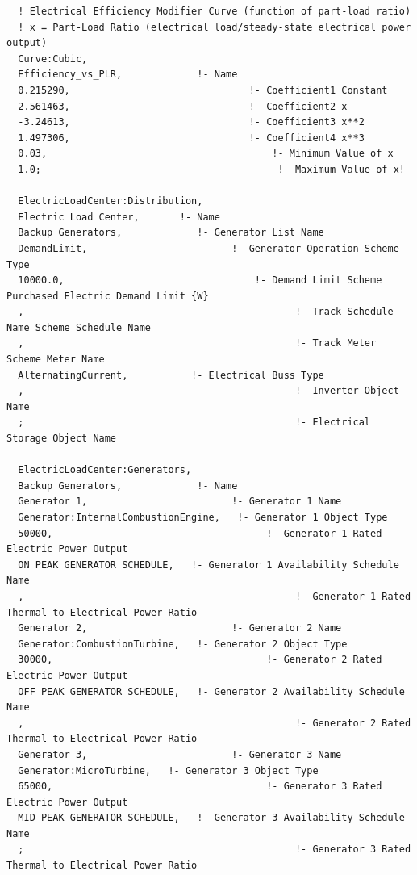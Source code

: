 \begin{lstlisting}
  ! Electrical Efficiency Modifier Curve (function of part-load ratio)
  ! x = Part-Load Ratio (electrical load/steady-state electrical power output)
  Curve:Cubic,
  Efficiency_vs_PLR,             !- Name
  0.215290,                               !- Coefficient1 Constant
  2.561463,                               !- Coefficient2 x
  -3.24613,                               !- Coefficient3 x**2
  1.497306,                               !- Coefficient4 x**3
  0.03,                                       !- Minimum Value of x
  1.0;                                         !- Maximum Value of x!

  ElectricLoadCenter:Distribution,
  Electric Load Center,       !- Name
  Backup Generators,             !- Generator List Name
  DemandLimit,                         !- Generator Operation Scheme Type
  10000.0,                                 !- Demand Limit Scheme Purchased Electric Demand Limit {W}
  ,                                               !- Track Schedule Name Scheme Schedule Name
  ,                                               !- Track Meter Scheme Meter Name
  AlternatingCurrent,           !- Electrical Buss Type
  ,                                               !- Inverter Object Name
  ;                                               !- Electrical Storage Object Name

  ElectricLoadCenter:Generators,
  Backup Generators,             !- Name
  Generator 1,                         !- Generator 1 Name
  Generator:InternalCombustionEngine,   !- Generator 1 Object Type
  50000,                                     !- Generator 1 Rated Electric Power Output
  ON PEAK GENERATOR SCHEDULE,   !- Generator 1 Availability Schedule Name
  ,                                               !- Generator 1 Rated Thermal to Electrical Power Ratio
  Generator 2,                         !- Generator 2 Name
  Generator:CombustionTurbine,   !- Generator 2 Object Type
  30000,                                     !- Generator 2 Rated Electric Power Output
  OFF PEAK GENERATOR SCHEDULE,   !- Generator 2 Availability Schedule Name
  ,                                               !- Generator 2 Rated Thermal to Electrical Power Ratio
  Generator 3,                         !- Generator 3 Name
  Generator:MicroTurbine,   !- Generator 3 Object Type
  65000,                                     !- Generator 3 Rated Electric Power Output
  MID PEAK GENERATOR SCHEDULE,   !- Generator 3 Availability Schedule Name
  ;                                               !- Generator 3 Rated Thermal to Electrical Power Ratio
\end{lstlisting}


